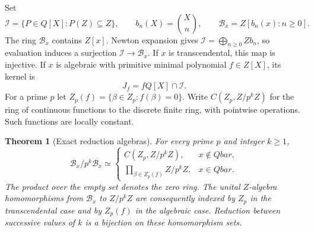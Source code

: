 \documentclass[11pt,a4paper]{article}
\newcommand{\Q}{\mathbb Q}
\newcommand{\Z}{\mathbb Z}
\newcommand{\QB}{\overline{\mathbb Q}}
\newcommand{\Qbar}{\overline{\mathbb Q}}
\newtheorem{theorem}{Theorem}[section]
\theoremstyle{definition}
\theoremstyle{remark}
\theoremstyle{plain}
\numberwithin{equation}{section}
\def\Qbar{Qbar}\def\QB{Qbar}\def\mathbb#1{#1}%
\begin{document}
Set
\[
 \mathcal I=\{P\in\Q[X]:P(\Z)\subseteq\Z\},\qquad
 b_n(X)=\binom Xn,\qquad
 \mathcal B_x=\Z[b_n(x):n\ge0].
\]
The ring $\mathcal B_x$ contains $\Z[x]$.  Newton expansion gives
$\mathcal I=\bigoplus_{n\ge0}\Z b_n$, so evaluation induces a
surjection $\mathcal I\to\mathcal B_x$.  If $x$ is transcendental,
this map is injective.  If $x$ is algebraic with primitive minimal
polynomial $f\in\Z[X]$, its kernel is
\[
 J_f=f\Q[X]\cap\mathcal I.
\]
For a prime $p$ let $Z_p(f)=\{\beta\in\Z_p:f(\beta)=0\}$.
Write $C(\Z_p,\Z/p^k\Z)$ for the ring of continuous functions to
the discrete finite ring, with pointwise operations.  Such functions
are locally constant.

\begin{theorem}[Exact reduction algebras]\label{ra:bin:thm:reduction}
For every prime $p$ and integer $k\ge1$,
\[
 \mathcal B_x/p^k\mathcal B_x\simeq
 \begin{cases}
 C(\Z_p,\Z/p^k\Z),&x\notin\Qbar,\\[2mm]
 \displaystyle\prod_{\beta\in Z_p(f)}\Z/p^k\Z,&x\in\Qbar.
 \end{cases}
\]
The product over the empty set denotes the zero ring.  The unital
$\Z$-algebra homomorphisms from $\mathcal B_x$ to $\Z/p^k\Z$
are consequently indexed by $\Z_p$ in the transcendental case and
by $Z_p(f)$ in the algebraic case.  Reduction between successive
values of $k$ is a bijection on these homomorphism sets.
\end{theorem}
\end{document}
